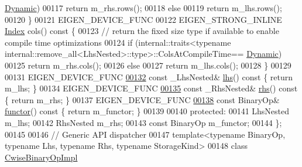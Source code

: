 \begin{DoxyCode}
      \hyperlink{namespace_eigen_ad81fa7195215a0ce30017dfac309f0b2}{Dynamic})
00117         \textcolor{keywordflow}{return} m\_rhs.rows();
00118       \textcolor{keywordflow}{else}
00119         \textcolor{keywordflow}{return} m\_lhs.rows();
00120     \}
00121     EIGEN\_DEVICE\_FUNC
00122     EIGEN\_STRONG\_INLINE \hyperlink{namespace_eigen_a62e77e0933482dafde8fe197d9a2cfde}{Index} cols()\textcolor{keyword}{ const }\{
00123       \textcolor{comment}{// return the fixed size type if available to enable compile time optimizations}
00124       \textcolor{keywordflow}{if} (internal::traits<\textcolor{keyword}{typename} internal::remove\_all<LhsNested>::type>::ColsAtCompileTime==
      \hyperlink{namespace_eigen_ad81fa7195215a0ce30017dfac309f0b2}{Dynamic})
00125         \textcolor{keywordflow}{return} m\_rhs.cols();
00126       \textcolor{keywordflow}{else}
00127         \textcolor{keywordflow}{return} m\_lhs.cols();
00128     \}
00129 
00131     EIGEN\_DEVICE\_FUNC
\hyperlink{group___core___module_a0f73e7585dfb54d41c1983e1e6a4b269}{00132}     \textcolor{keyword}{const} \_LhsNested& \hyperlink{group___core___module_a0f73e7585dfb54d41c1983e1e6a4b269}{lhs}()\textcolor{keyword}{ const }\{ \textcolor{keywordflow}{return} m\_lhs; \}
00134     EIGEN\_DEVICE\_FUNC
\hyperlink{group___core___module_a3a61cbdf6d1adaa62f012045b04b6d09}{00135}     \textcolor{keyword}{const} \_RhsNested& \hyperlink{group___core___module_a3a61cbdf6d1adaa62f012045b04b6d09}{rhs}()\textcolor{keyword}{ const }\{ \textcolor{keywordflow}{return} m\_rhs; \}
00137     EIGEN\_DEVICE\_FUNC
\hyperlink{group___core___module_acc4efe306adbdc0c95cc1c73a8cf81e4}{00138}     \textcolor{keyword}{const} BinaryOp& \hyperlink{group___core___module_acc4efe306adbdc0c95cc1c73a8cf81e4}{functor}()\textcolor{keyword}{ const }\{ \textcolor{keywordflow}{return} m\_functor; \}
00139 
00140   \textcolor{keyword}{protected}:
00141     LhsNested m\_lhs;
00142     RhsNested m\_rhs;
00143     \textcolor{keyword}{const} BinaryOp m\_functor;
00144 \};
00145 
00146 \textcolor{comment}{// Generic API dispatcher}
00147 \textcolor{keyword}{template}<\textcolor{keyword}{typename} BinaryOp, \textcolor{keyword}{typename} Lhs, \textcolor{keyword}{typename} Rhs, \textcolor{keyword}{typename} StorageKind>
00148 \textcolor{keyword}{class }\hyperlink{class_eigen_1_1_cwise_binary_op_impl}{CwiseBinaryOpImpl}

\end{DoxyCode}
